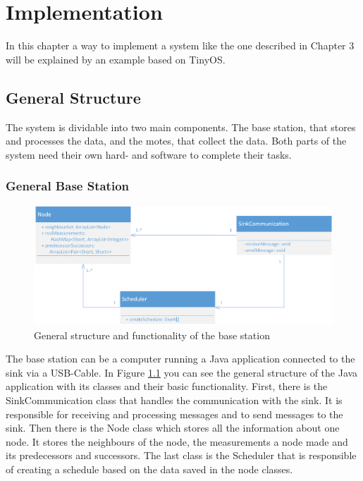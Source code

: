 \chapter{Implementation}

In this chapter a way to implement a system like the one described in Chapter 3 will be explained by an example based on TinyOS.    

\section{General Structure}
The system is dividable into two main components. The base station, that stores and processes the data, and the motes, that collect the data. Both parts of the system need their own hard- and software to complete their tasks.  
\subsection{General Base Station}

\begin{figure}[htbp]
	\centering
    \includegraphics[scale=0.7]{content/images/BaseStation/Klassendiagram}
   	\caption{General structure and functionality of the base station}
    \label{fig:bsKlassen}
\end{figure}

The base station can be a computer running a Java application connected to the sink via a USB-Cable. In Figure \ref{fig:bsKlassen} you can see the general structure of the Java application with its classes and their basic functionality. First, there is the SinkCommunication class that handles the communication with the sink. It is responsible for receiving and processing messages and to send messages to the sink. Then there is the Node class which stores all the information about one node. It stores the neighbours of the node, the measurements a node made and its predecessors and successors. The last class is the Scheduler that is responsible of creating a schedule based on the data saved in the node classes.  
